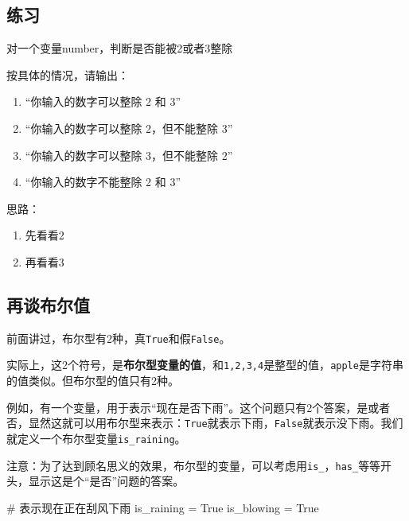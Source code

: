\documentclass[
  letterpaper,
  DIV=11,
  numbers=noendperiod]{scrreprt}
\newenvironment{Shaded}{\begin{snugshade}}{\end{snugshade}}
\newcommand{\CommentTok}[1]{\textcolor[rgb]{0.37,0.37,0.37}{#1}}
\newcommand{\NormalTok}[1]{\textcolor[rgb]{0.00,0.23,0.31}{#1}}
\newcommand{\OperatorTok}[1]{\textcolor[rgb]{0.37,0.37,0.37}{#1}}
\newcommand{\VariableTok}[1]{\textcolor[rgb]{0.07,0.07,0.07}{#1}}
\providecommand{\tightlist}{%
  \setlength{\itemsep}{0pt}\setlength{\parskip}{0pt}}\usepackage{longtable,booktabs,array}
\begin{document}
\hypertarget{ux7ec3ux4e60-1}{%
\subsection{练习}\label{ux7ec3ux4e60-1}}

对一个变量number，判断是否能被2或者3整除

按具体的情况，请输出：

\begin{enumerate}
\def\labelenumi{\arabic{enumi}.}
\tightlist
\item
  ``你输入的数字可以整除 2 和 3''
\item
  ``你输入的数字可以整除 2，但不能整除 3''
\item
  ``你输入的数字可以整除 3，但不能整除 2''
\item
  ``你输入的数字不能整除 2 和 3''
\end{enumerate}

思路：

\begin{enumerate}
\def\labelenumi{\arabic{enumi}.}
\tightlist
\item
  先看看2
\item
  再看看3
\end{enumerate}

\hypertarget{ux518dux8c08ux5e03ux5c14ux503c}{%
\subsection{再谈布尔值}\label{ux518dux8c08ux5e03ux5c14ux503c}}

前面讲过，布尔型有2种，真\texttt{True}和假\texttt{False}。

实际上，这2个符号，是\textbf{布尔型变量的值}，和\texttt{1,2,3,4}是整型的值，\texttt{\textquotesingle{}apple\textquotesingle{}}是字符串的值类似。但布尔型的值只有2种。

例如，有一个变量，用于表示``现在是否下雨''。这个问题只有2个答案，是或者否，显然这就可以用布尔型来表示：\texttt{True}就表示下雨，\texttt{False}就表示没下雨。我们就定义一个布尔型变量\texttt{is\_raining}。

注意：为了达到顾名思义的效果，布尔型的变量，可以考虑用\texttt{is\_}，\texttt{has\_}等等开头，显示这是个``是否''问题的答案。

\begin{Shaded}
\begin{Highlighting}[]
\CommentTok{\# 表示现在正在刮风下雨}
\NormalTok{is\_raining }\OperatorTok{=} \VariableTok{True} 
\NormalTok{is\_blowing }\OperatorTok{=} \VariableTok{True}
\end{Highlighting}
\end{Shaded}
\end{document}
